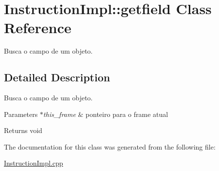 \hypertarget{class_instruction_impl_1_1getfield}{}\section{Instruction\+Impl\+:\+:getfield Class Reference}
\label{class_instruction_impl_1_1getfield}


Busca o campo de um objeto.  




\subsection{Detailed Description}
Busca o campo de um objeto. 


\begin{DoxyParams}{Parameters}
{\em $\ast$this\+\_\+frame} & ponteiro para o frame atual \\
\hline
\end{DoxyParams}
\begin{DoxyReturn}{Returns}
void 
\end{DoxyReturn}


The documentation for this class was generated from the following file\+:\begin{DoxyCompactItemize}
\item 
\hyperlink{_instruction_impl_8cpp}{Instruction\+Impl.\+cpp}\end{DoxyCompactItemize}
